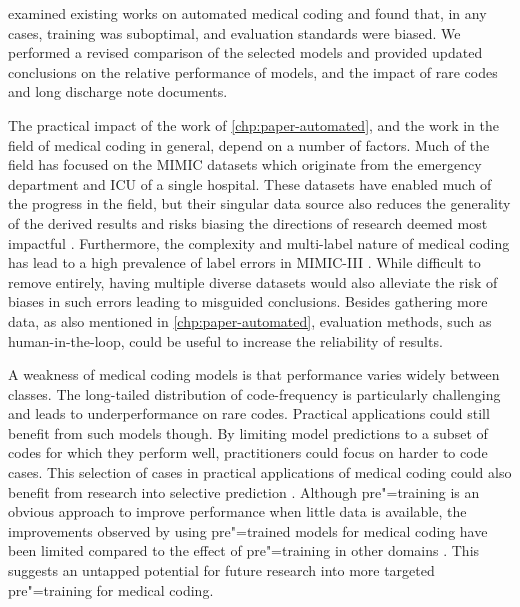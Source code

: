 \vspace{1em}
\textbf{} examined existing works on automated medical coding and found that, in any cases, training was suboptimal, and evaluation standards were biased. We performed a revised comparison of the selected models and provided updated conclusions on the relative performance of models, and the impact of rare codes and long discharge note documents. 

The practical impact of the work of \cref{chp:paper-automated}, and the work in the field of medical coding in general, depend on a number of factors. 
Much of the field has focused on the MIMIC datasets which originate from the emergency department and ICU of a single hospital. These datasets have enabled much of the progress in the field, but their singular data source also reduces the generality of the derived results and risks biasing the directions of research deemed most impactful \parencite{tengReviewDeepNeural2022, venkateshAutomatingOverburdenedClinical2023,johnsonMIMICIIIFreelyAccessible2016,johnsonMIMICIVFreelyAccessible2023}. 
Furthermore, the complexity and multi-label nature of medical coding has lead to a high prevalence of label errors in MIMIC-III \parencite{searleExperimentalEvaluationDevelopment2020}. While difficult to remove entirely, having multiple diverse datasets would also alleviate the risk of biases in such errors leading to misguided conclusions. Besides gathering more data, as also mentioned in \cref{chp:paper-automated}, evaluation methods, such as human-in-the-loop, could be useful to increase the reliability of results. 

A weakness of medical coding models is that performance varies widely between classes. The long-tailed distribution of code-frequency is particularly challenging and leads to underperformance on rare codes. Practical applications could still benefit from such models though. By limiting model predictions to a subset of codes for which they perform well, practitioners could focus on harder to code cases. This selection of cases in practical applications of medical coding could also benefit from research into selective prediction \parencite{geifman_selective_2017}. 
Although pre"=training is an obvious approach to improve performance when little data is available, the improvements observed by using pre"=trained models for medical coding have been limited \parencite{jiDoesMagicBERT2021,gaoLimitationsTransformersClinical2021,michalopoulosICDBigBirdContextualEmbedding2022,pascualBERTbasedAutomaticICD2021,zhangBERTXMLLargeScale2020} compared to the effect of pre"=training in other domains \parencite{mohamed_selfsupervised_2022, linPretrainedTransformersText2021,baevski_wav2vec_2020,devlin_bert_2018,dosovitskiy_image_2021}. This suggests an untapped potential for future research into more targeted pre"=training for medical coding. 

